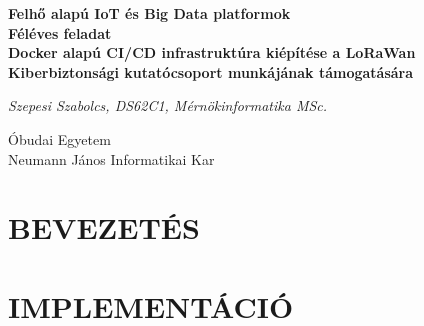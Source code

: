 



\begin{titlepage}
    \begin{center}
        \vspace*{\fill}
        {\Large
        \textbf{Felhő alapú IoT és Big Data platformok\\
        Féléves feladat}}\\[3cm]

        {\Large
        \textbf{Docker alapú CI/CD infrastruktúra kiépítése a LoRaWan Kiberbiztonsági kutatócsoport munkájának támogatására}}\\[3cm]
            
        \vspace*{\fill}
        
       
        
        \normalsize
        \textit{Szepesi Szabolcs, DS62C1, Mérnökinformatika MSc.}\\[2cm]
        
        \normalsize

        Óbudai Egyetem\\
        Neumann János Informatikai Kar\\

        \vspace*{\fill}
        
        \the\year
        
    \end{center}
\end{titlepage}





\newpage
{}
\tableofcontents
\newpage




\clearpage
\section{BEVEZETÉS}


\clearpage
\section{IMPLEMENTÁCIÓ}




